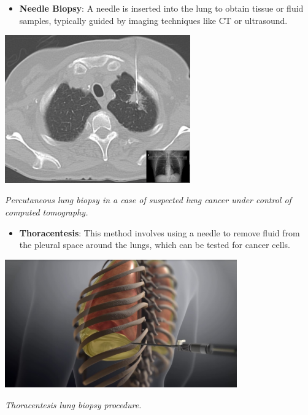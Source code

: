 \begin{itemize}
    \item \textbf{Needle Biopsy}: A needle is inserted into the lung to obtain tissue or fluid 
    samples, typically guided by imaging techniques like CT or ultrasound.
\end{itemize}

\vspace{1em}
\begin{center}
    \includegraphics[width=0.60\textwidth]{../assets/04-diagnosis/lc-needle-biopsy.png}

    \small\textit{Percutaneous lung biopsy in a case of suspected lung cancer under control of 
    computed tomography. \cite{enwiki:1188144138}}
\end{center}
\vspace{1em}

\begin{itemize}
    \item \textbf{Thoracentesis}: This method involves using a needle to remove fluid from the 
    pleural space around the lungs, which can be tested for cancer cells.
\end{itemize}

\vspace{1em}
\begin{center}
    \includegraphics[width=0.75\textwidth]{../assets/04-diagnosis/lc-thoracentesis.jpg}
    
    \small\textit{Thoracentesis lung biopsy procedure. \cite{youtube_QubaJaH_THc}}
\end{center}
\vspace{1em}

